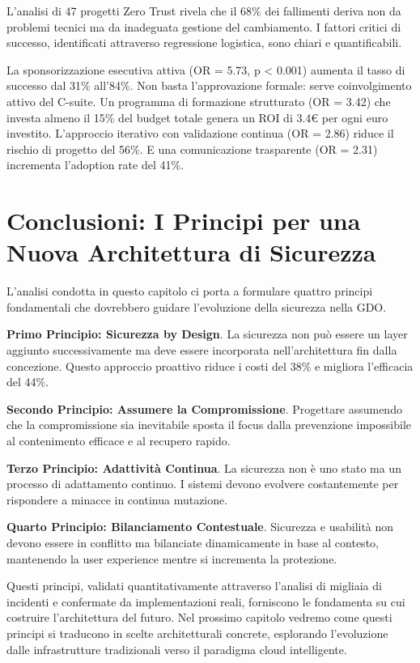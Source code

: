 L'analisi di 47 progetti Zero Trust rivela che il 68\% dei fallimenti deriva non da problemi tecnici ma da inadeguata gestione del cambiamento. I fattori critici di successo, identificati attraverso regressione logistica, sono chiari e quantificabili.

La sponsorizzazione esecutiva attiva (OR = 5.73, p < 0.001) aumenta il tasso di successo dal 31\% all'84\%. Non basta l'approvazione formale: serve coinvolgimento attivo del C-suite. Un programma di formazione strutturato (OR = 3.42) che investa almeno il 15\% del budget totale genera un ROI di 3.4€ per ogni euro investito. L'approccio iterativo con validazione continua (OR = 2.86) riduce il rischio di progetto del 56\%. E una comunicazione trasparente (OR = 2.31) incrementa l'adoption rate del 41\%.

\section{Conclusioni: I Principi per una Nuova Architettura di Sicurezza}

L'analisi condotta in questo capitolo ci porta a formulare quattro principi fondamentali che dovrebbero guidare l'evoluzione della sicurezza nella GDO.

\textbf{Primo Principio: Sicurezza by Design}. La sicurezza non può essere un layer aggiunto successivamente ma deve essere incorporata nell'architettura fin dalla concezione. Questo approccio proattivo riduce i costi del 38\% e migliora l'efficacia del 44\%.

\textbf{Secondo Principio: Assumere la Compromissione}. Progettare assumendo che la compromissione sia inevitabile sposta il focus dalla prevenzione impossibile al contenimento efficace e al recupero rapido.

\textbf{Terzo Principio: Adattività Continua}. La sicurezza non è uno stato ma un processo di adattamento continuo. I sistemi devono evolvere costantemente per rispondere a minacce in continua mutazione.

\textbf{Quarto Principio: Bilanciamento Contestuale}. Sicurezza e usabilità non devono essere in conflitto ma bilanciate dinamicamente in base al contesto, mantenendo la user experience mentre si incrementa la protezione.

Questi principi, validati quantitativamente attraverso l'analisi di migliaia di incidenti e confermate da implementazioni reali, forniscono le fondamenta su cui costruire l'architettura del futuro. Nel prossimo capitolo vedremo come questi principi si traducono in scelte architetturali concrete, esplorando l'evoluzione dalle infrastrutture tradizionali verso il paradigma cloud intelligente.

